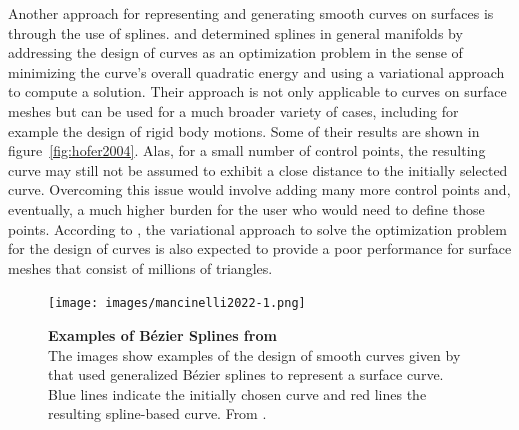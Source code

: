 \documentclass{stdlocal}
\begin{document}
Another approach for representing and generating smooth curves on surfaces is through the use of splines.
\textcite{hofer2004} and \textcite{pottmann2005} determined splines in general manifolds by addressing the design of curves as an optimization problem in the sense of minimizing the curve's overall quadratic energy and using a variational approach to compute a solution.
Their approach is not only applicable to curves on surface meshes but can be used for a much broader variety of cases, including for example the design of rigid body motions.
Some of their results are shown in figure~\ref{fig:hofer2004}.
Alas, for a small number of control points, the resulting curve may still not be assumed to exhibit a close distance to the initially selected curve.
Overcoming this issue would involve adding many more control points and, eventually, a much higher burden for the user who would need to define those points.
According to \textcite{mancinelli2022}, the variational approach to solve the optimization problem for the design of curves is also expected to provide a poor performance for surface meshes that consist of millions of triangles.

\begin{figure}[t]
  \centering
  \texttt{[image: images/mancinelli2022-1.png]}
  \caption[Examples of Bézier Splines from \textcite{mancinelli2022}]{%
    \textbf{Examples of Bézier Splines from \textcite{mancinelli2022}}\\
    The images show examples of the design of smooth curves given by \textcite{mancinelli2022} that used generalized Bézier splines to represent a surface curve.
    Blue lines indicate the initially chosen curve and red lines the resulting spline-based curve.
    From \textcite{mancinelli2022}.
  }
  \label{fig:mancinelli2022}
\end{figure}
\end{document}
